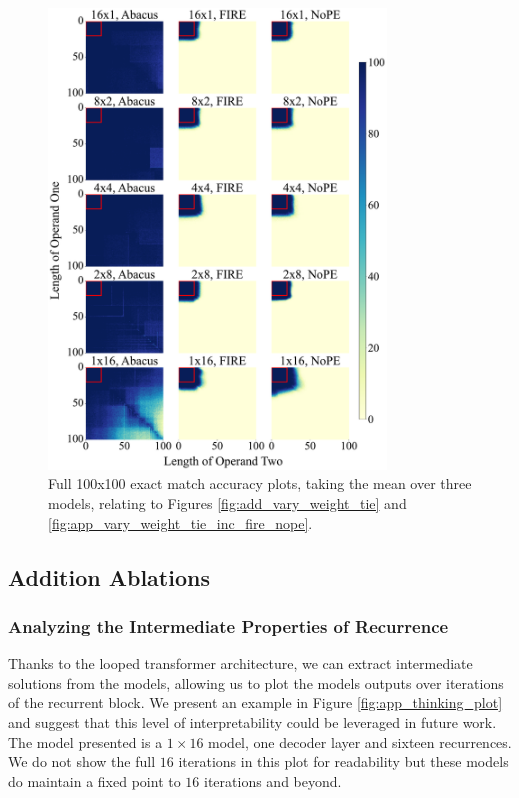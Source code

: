 \documentclass{article}
\begin{document}
\begin{figure}[ht!]
    \centering
    \includegraphics[width=0.8\textwidth]{Figures/grids/grids_plot_four.pdf}
    \caption{
    Full 100x100 exact match accuracy plots, taking the mean over three models, relating to Figures \ref{fig:add_vary_weight_tie} and \ref{fig:app_vary_weight_tie_inc_fire_nope}.
    }
    \label{fig:app_grid_vary_weight_tie}
\end{figure}

\subsection{Addition Ablations}
\subsubsection{Analyzing the Intermediate Properties of Recurrence}
Thanks to the looped transformer architecture, we can extract intermediate solutions from the models, allowing us to plot the models outputs over iterations of the recurrent block.
We present an example in Figure \ref{fig:app_thinking_plot} and suggest that this level of interpretability could be leveraged in future work.
The model presented is a \(1\times16\) model, one decoder layer and sixteen recurrences.
We do not show the full \(16\) iterations in this plot for readability but these models do maintain a fixed point to \(16\) iterations and beyond.
\end{document}
